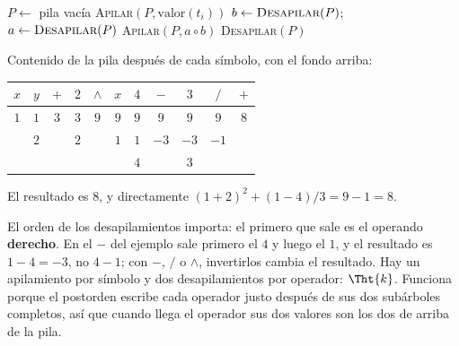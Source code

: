 \documentclass[11pt,letterpaper]{article}
\begin{document}
\begin{algorithm}[H]
\caption{\textsc{Evaluar-Posfija}$(t_1, \dots, t_k)$}
\label{alg:arbol-evaluar-posfija}
\begin{algorithmic}[1]
  \State $P \gets$ pila vacía
      \State \textsc{Apilar}$(P, \text{valor}(t_i))$
    \Else {}
      \State $b \gets \textsc{Desapilar}(P)$; \
             $a \gets \textsc{Desapilar}(P)$
      \State \textsc{Apilar}$(P, a \circ b)$
    \EndIf
  \EndFor
  \State \Return \textsc{Desapilar}$(P)$
\EndProcedure
\end{algorithmic}
\end{algorithm}

\begin{ejemplo}[Evaluar la posfija con $x = 1$, $y = 2$]
  \label{ej:arbol-posfija}
  Contenido de la pila después de cada símbolo, con el fondo arriba:
  \begin{center}
  \small
  \begin{tabular}{*{11}{c}}
    \toprule
    $x$ & $y$ & $+$ & $2$ & $\wedge$ & $x$ & $4$ & $-$ & $3$ & $/$
      & $+$ \\
    \midrule
    $1$ & $1$ & $3$ & $3$ & $9$ & $9$ & $9$ & $9$ & $9$ & $9$ & $8$ \\
        & $2$ &     & $2$ &     & $1$ & $1$ & $-3$ & $-3$ & $-1$ & \\
        &     &     &     &     &     & $4$ &      & $3$  &      & \\
    \bottomrule
  \end{tabular}
  \end{center}
  El resultado es $8$, y directamente
  $(1 + 2)^2 + (1 - 4)/3 = 9 - 1 = 8$.
\end{ejemplo}

El orden de los desapilamientos importa: el primero que sale es el
operando \textbf{derecho}. En el $-$ del ejemplo sale primero el $4$
y luego el $1$, y el resultado es $1 - 4 = -3$, no $4 - 1$; con $-$,
$/$ o $\wedge$, invertirlos cambia el resultado. Hay un apilamiento
por símbolo y dos desapilamientos por operador: $\Tht{k}$. Funciona
porque el postorden escribe cada operador justo después de sus dos
subárboles completos, así que cuando llega el operador sus dos
valores son los dos de arriba de la pila.

\end{document}
